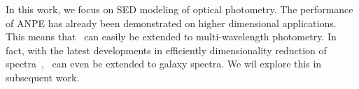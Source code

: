 In this work, we focus on SED modeling of optical photometry. 
The performance of ANPE has already been demonstrated on higher dimensional
applications. 
This means that \sedflow~can easily be extended to multi-wavelength photometry.
In fact, with the latest developments in efficiently dimensionality reduction
of spectra~\citep[][Melchior \& Hahn 2022]{portillo2020}, \sedflow~can even be
extended to galaxy spectra. 
We wil explore this in subsequent work. 
